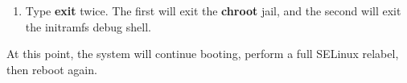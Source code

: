 \begin{flushleft}
\begin{itemize}
\begin{enumerate}
			\item Type \textbf{exit} twice. The first will exit the \textbf{chroot} jail, and the second will exit the initramfs debug shell.
		\end{enumerate}
	
		At this point, the system will continue booting, perform a full SELinux relabel, then reboot again.
	\end{itemize}
\end{flushleft}

\newpage